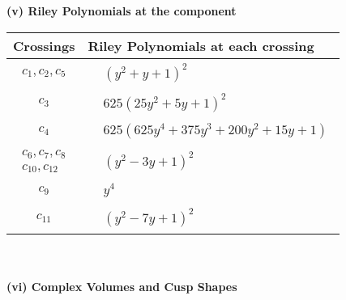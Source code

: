 \documentclass[1p]{elsarticle_modified}
\theoremstyle{definition}
\begin{document}
\newpage\renewcommand{\arraystretch}{1}
\flushleft \textbf{(v) Riley Polynomials at the component}\newline \\
\begin{tabular}{m{50pt}|m{274pt}}
Crossings & \hspace{64pt}Riley Polynomials at each crossing \\
\hline $$\begin{aligned}c_{1},c_{2},c_{5}\end{aligned}$$&$\begin{aligned}
&(y^2+y+1)^2
\end{aligned}$\\
\hline $$\begin{aligned}c_{3}\end{aligned}$$&$\begin{aligned}
&625(25 y^2+5 y+1)^2
\end{aligned}$\\
\hline $$\begin{aligned}c_{4}\end{aligned}$$&$\begin{aligned}
&625(625 y^4+375 y^3+200 y^2+15 y+1)
\end{aligned}$\\
\hline $$\begin{aligned}c_{6},c_{7},c_{8}\\c_{10},c_{12}\end{aligned}$$&$\begin{aligned}
&(y^2-3 y+1)^2
\end{aligned}$\\
\hline $$\begin{aligned}c_{9}\end{aligned}$$&$\begin{aligned}
&y^4
\end{aligned}$\\
\hline $$\begin{aligned}c_{11}\end{aligned}$$&$\begin{aligned}
&(y^2-7 y+1)^2
\end{aligned}$\\
\hline
\end{tabular}\\~\\
\newpage\flushleft \textbf{(vi) Complex Volumes and Cusp Shapes}
\end{document}
